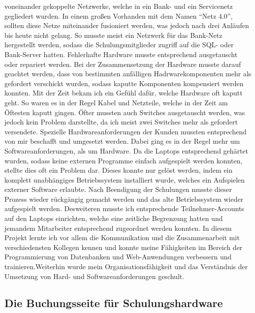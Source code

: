 voneinander gekoppelte Netzwerke, welche in ein Bank- und ein Servicenetz gegliedert wurden. In einem großen Vorhanden mit dem Namen “Netz 4.0”, sollten diese Netze miteinander fusioniert werden, was jedoch nach drei Anläufen bis heute nicht gelang. So musste meist ein Netzwerk für das Bank-Netz hergestellt werden, sodass die Schulungsmitglieder zugriff auf die SQL- oder Bank-Server hatten. Fehlerhafte Hardware musste entsprechend ausgetauscht oder repariert werden. Bei der Zusammensetzung der Hardware musste darauf geachtet werden, dass von bestimmten anfälligen Hadrwarekomponenten mehr als gefordert verschickt wurden, sodass kaputte Komponenten kompensiert werden konnten. Mit der Zeit bekam ich ein Gefühl dafür, welche Hardware oft kaputt geht. So waren es in der Regel Kabel und Netzteile, welche in der Zeit am Öftesten kaputt gingen. Öfter mussten auch Switches ausgetauscht werden, was jedoch kein Problem darstellte, da ich meist zwei Switches mehr als gefordert versendete. Spezielle Hardwareanforderungen der Kunden mussten entsprechend von mir beschafft und umgesetzt werden. Dabei ging es in der Regel mehr um Softwareanforderungen, als um Hardware. Da die Laptops entsprechend gehärtet wurden, sodass keine externen Programme einfach aufgespielt werden konnten, stellte dies oft ein Problem dar. Dieses konnte nur gelöst werden, indem ein komplett unabhängiges Betriebssystem installiert wurde, welches ein Aufspielen externer Software erlaubte. Nach Beendigung der Schulungen musste dieser Prozess wieder rückgängig gemacht werden und das alte Betriebssystem wieder aufgespielt werden. Desweiteren musste ich entsprechende Teilnehmer-Accounts auf den Laptops einrichten, welche eine zeitliche Begrenzung hatten und jemandem Mitarbeiter entsprechend zugeordnet werden konnten. 
In diesem Projekt lernte ich vor allem die Kommunikation und die Zusammenarbeit mit verschiedensten Kollegen kennen und konnte meine Fähigkeiten im Bereich der Programmierung von Datenbanken und Web-Anwendungen verbessern und trainieren.Weiterhin wurde mein Organisationsfähigkeit und das Verständnis der Umsetzung von Hard- und Softwareanforderungen geschult. 

\subsection{Die Buchungsseite für Schulungshardware}
\label{Die Buchungsseite für Schulungshardware}



